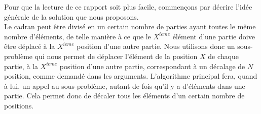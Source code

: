 Pour que la lecture de ce rapport soit plus facile, commençons par décrire l'idée générale de la solution que nous proposons. \\

Le cadran peut être divisé en un certain nombre de parties ayant toutes le même nombre d'éléments, de telle manière à ce que le $X^{ieme}$ élément d'une partie doive être déplacé à la $X^{ieme}$ position d'une autre partie. Nous utilisons donc un sous-problème qui nous permet de déplacer l'élément de la position $X$ de chaque partie, à la $X^{ieme}$ position d'une autre partie, correspondant à un décalage de $N$ position, comme demandé dans les arguments. L'algorithme principal fera, quand à lui, un appel au sous-problème, autant de fois qu'il y a d'éléments dans une partie. Cela permet donc de décaler tous les éléments d'un certain nombre de positions. 
